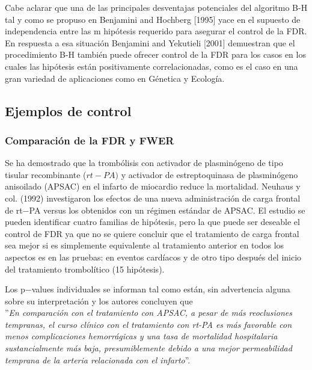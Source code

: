 \documentclass[11pt,letterpaper]{article}
\begin{document}
Cabe aclarar que una de las principales desventajas potenciales del algoritmo B-H tal y como se propuso en Benjamini and Hochberg [1995] yace en el supuesto de independencia entre las m hipótesis requerido para asegurar el control de la FDR. En respuesta a esa situación Benjamini and Yekutieli [2001] demuestran que el procedimiento B-H también puede ofrecer control de la FDR para los casos en los cuales las hipótesis están positivamente correlacionadas, como es el caso en una gran variedad de aplicaciones como en Génetica y Ecología. 

\subsection{Ejemplos de control}

\subsubsection*{Comparación de la FDR y FWER}
Se ha demostrado que la trombólisis con activador de plasminógeno de tipo tisular recombinante ($rt-PA)$ y activador de estreptoquinasa de plasminógeno anisoilado (APSAC) en el infarto de miocardio reduce la mortalidad. Neuhaus y col. (1992) investigaron los efectos de una nueva administración de carga frontal de rt$-$PA versus los obtenidos con un régimen estándar de APSAC. El estudio se pueden identificar cuatro familias de hipótesis, pero la que puede ser deseable el control de FDR ya que no se quiere concluir que el tratamiento de carga frontal sea mejor si es simplemente equivalente al tratamiento anterior en todos los aspectos es en las pruebas: en eventos cardíacos y de otro tipo después del inicio del tratamiento trombolítico (15 hipótesis).

Los p$-$values individuales se informan tal como están, sin advertencia alguna sobre su interpretación y los autores concluyen que\\

''\textit{En comparación con el tratamiento con APSAC, a pesar de más reoclusiones tempranas, el curso clínico con el tratamiento con rt-PA es más favorable con menos complicaciones hemorrágicas y una tasa de mortalidad hospitalaria sustancialmente más baja, presumiblemente debido a una mejor permeabilidad temprana de la arteria relacionada con el infarto}''.\\
\end{document}

